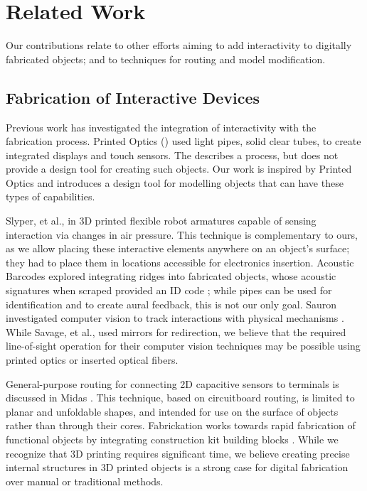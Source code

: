 \section{Related Work}
Our contributions relate to other efforts aiming to add interactivity to digitally fabricated objects; and to techniques for routing and model modification.  

\subsection{Fabrication of Interactive Devices}

Previous work has investigated the integration of interactivity with the fabrication process.  Printed Optics (\cite{Willis-printedoptics}) used light pipes, solid clear tubes, to create integrated displays and touch sensors. The describes a process, but does not provide a design tool for creating such objects. Our work is inspired by Printed Optics and introduces a design tool for modelling objects that can have these types of capabilities.  

Slyper, et al., in \cite{Slyper-pressure} 3D printed flexible robot armatures capable of sensing interaction via changes in air pressure.  This technique is complementary to ours, as we allow placing these interactive elements anywhere on an object's surface; they had to place them in locations accessible for electronics insertion. Acoustic Barcodes explored integrating ridges into fabricated objects, whose acoustic signatures when scraped provided an ID code \cite{Harrison-acoustic}; while pipes can be used for identification and to create aural feedback, this is not our only goal.  Sauron investigated computer vision to track interactions with physical mechanisms \cite{Savage-sauron}.  While Savage, et al., used mirrors for redirection, we believe that the required line-of-sight operation for their computer vision techniques may be possible using printed optics or inserted optical fibers.  

General-purpose routing for connecting 2D capacitive sensors to terminals is discussed in Midas \cite{Savage-midas}.  This technique, based on circuitboard routing, is limited to planar and unfoldable shapes, and intended for use on the surface of objects rather than through their cores.  Fabrickation works towards rapid fabrication of functional objects by integrating construction kit building blocks \cite{Mueller-fabrickation}.  While we recognize that 3D printing requires significant time, we believe creating precise internal structures in 3D printed objects is a strong case for digital fabrication over manual or traditional methods.

